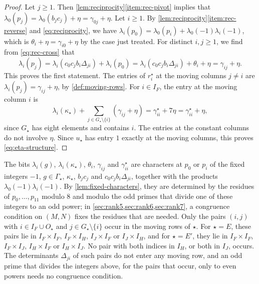 \begin{proof}
Let $j\ge1$. Then \cref{lem:reciprocity}\ref{item:rec-pivot} implies that $\lambda_0(p_j)=\lambda_0(b_jc_j)+\eta=\gamma_{0j}+\eta$. Let $i\ge1$. By \cref{lem:reciprocity}\ref{item:rec-reverse} and \eqref{eq:reciprocity}, we have $\lambda_i(p_0)=\lambda_0(p_i)+\lambda_0(-1)\lambda_i(-1)$, which is $\theta_i+\eta=\gamma_{i0}+\eta$ by the case just treated. For distinct $i,j\ge1$, we find from \eqref{eq:rec-cross} that
\begin{equation}
\lambda_i(p_j)=\lambda_i(c_0c_jb_i\Delta_{ji})+\lambda_i(p_0)=\lambda_i(c_0c_jb_i\Delta_{ji})+\theta_i+\eta=\gamma_{ij}+\eta.
\end{equation}
This proves the first statement. The entries of $r^\star_i$ at the moving columns $j\ne i$ are $\lambda_i(p_j)=\gamma_{ij}+\eta$, by \cref{def:moving-rows}. For $i\in I_F$, the entry at the moving column $i$ is
\begin{equation}
\lambda_i(\kappa_\star)+\sum_{j\in G_\star\setminus\{i\}}(\gamma_{ij}+\eta)=\gamma^\star_{ii}+7\eta=\gamma^\star_{ii}+\eta,
\end{equation}
since $G_\star$ has eight elements and contains $i$. The entries at the constant columns do not involve $\eta$. Since $u_\star$ has entry $1$ exactly at the moving columns, this proves \eqref{eq:eta-structure}.
\end{proof}

\begin{remark}\label{rem:constant-characters}
The bits $\lambda_i(g)$, $\lambda_i(\kappa_\star)$, $\theta_i$, $\gamma_{ij}$ and $\gamma^\star_{ii}$ are characters at $p_0$ or $p_i$ of the fixed integers $-1$, $g\in\Gamma_\star$, $\kappa_\star$, $b_jc_j$ and $c_0c_jb_i\Delta_{ji}$, together with the products $\lambda_0(-1)\lambda_i(-1)$. By \cref{lem:fixed-characters}, they are determined by the residues of $p_0,\dots,p_{11}$ modulo $8$ and modulo the odd primes that divide one of these integers to an odd power; in \cref{sec:rank5,sec:rank6,sec:rank7}, a congruence condition on $(M,N)$ fixes the residues that are needed. Only the pairs $(i,j)$ with $i\in I_F\cup O_\star$ and $j\in G_\star\setminus\{i\}$ occur in the moving rows of $\star$. For $\star=E$, these pairs lie in $I_F\times I_F$, $I_F\times I_H$, $I_J\times I_F$ or $I_J\times I_H$, and for $\star=E'$, they lie in $I_F\times I_F$, $I_F\times I_J$, $I_H\times I_F$ or $I_H\times I_J$. No pair with both indices in $I_H$, or both in $I_J$, occurs. The determinants $\Delta_{ji}$ of such pairs do not enter any moving row, and an odd prime that divides the integers above, for the pairs that occur, only to even powers needs no congruence condition.
\end{remark}

